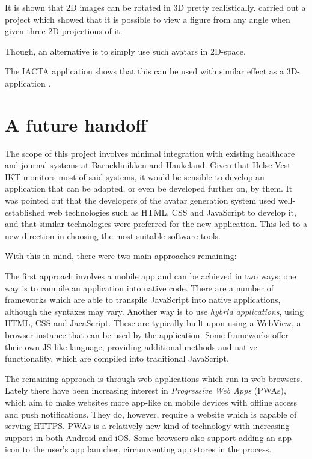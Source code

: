 It is shown that 2D images can be rotated in 3D pretty realistically. \textcite{rivers2010} carried out a project which showed that it is possible to view a figure from any angle when given three 2D projections of it.

Though, an alternative is to simply use such avatars in 2D-space. 


The IACTA application shows that this can be used with similar effect as a 3D-application \parencite{stalberg2018}.

\section{A future handoff}

The scope of this project involves minimal integration with existing healthcare and journal systems at Barneklinikken and Haukeland. Given that Helse Vest IKT monitors most of said systems, it would be sensible to develop an application that can be adapted, or even be developed further on, by them. It was pointed out that the developers of the avatar generation system used well-established web technologies such as HTML, CSS and JavaScript to develop it, and that similar technologies were preferred for the new application. This led to a new direction in choosing the most suitable software tools.

With this in mind, there were two main approaches remaining:

The first approach involves a mobile app and can be achieved in two ways; one way is to compile an application into native code. There are a number of frameworks which are able to transpile JavaScript into native applications, although the syntaxes may vary. Another way is to use \emph{hybrid applications}, using HTML, CSS and JacaScript. These are typically built upon using a WebView, a browser instance that can be used by the application. Some frameworks offer their own JS-like language, providing additional methods and native functionality, which are compiled into traditional JavaScript.

The remaining approach is through web applications which run in web browsers. Lately there have been increasing interest in \emph{Progressive Web Apps} (PWAs), which aim to make websites more app-like on mobile devices with offline access and push notifications. They do, however, require a website which is capable of serving HTTPS. PWAs is a relatively new kind of technology with increasing support in both Android and iOS. Some browsers also support adding an app icon to the user's app launcher, circumventing app stores in the process.

